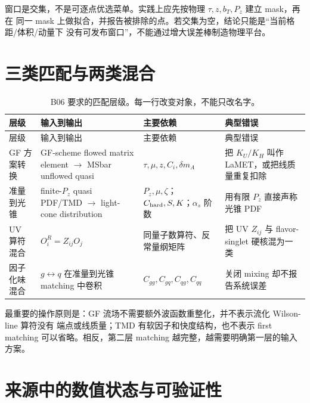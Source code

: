 窗口是交集，不是可逐点优选菜单。实践上应先按物理 \(\tau,z,b_T,P_z\) 建立 mask，再在
同一 mask 上做拟合，并报告被排除的点。若交集为空，结论只能是“当前格距/体积/动量下
没有可发布窗口”，不能通过增大误差棒制造物理平台。

\section{三类匹配与两类混合}

\begin{longtable}{@{}p{}p{}p{}p{}@{}}
\caption{B06 要求的匹配层级。每一行改变对象，不能只改名字。}\label{tab:b06-matching-layers}\\
\toprule
层级 & 输入到输出 & 主要依赖 & 典型错误 \\
\midrule
\endfirsthead
\toprule
层级 & 输入到输出 & 主要依赖 & 典型错误 \\
\midrule
\endhead
GF 方案转换 & GF-scheme flowed matrix element \(\to\) MSbar unflowed quasi & \(\tau,\mu,z,C_i,\delta m_A\) & 把 \(K_U/K_H\) 叫作 LaMET，或把线质量重复扣除 \\
准量到光锥 & finite-\(P_z\) quasi PDF/TMD \(\to\) light-cone distribution & \(P_z,\mu,\zeta\)；\(C_{\rm hard},S,K\)；\(\alpha_s\) 阶数 & 用有限 \(P_z\) 直接声称光锥 PDF \\
UV 算符混合 & \(O_i^{R}=Z_{ij}O_j\) & 同量子数算符、反常量纲矩阵 & 把 UV \(Z_{ij}\) 与 flavor-singlet 硬核混为一类 \\
因子化味混合 & \(g\leftrightarrow q\) 在准量到光锥 matching 中卷积 & \(C_{gg},C_{gq},C_{qg},C_{qq}\) & 关闭 mixing 却不报告系统误差 \\
\bottomrule
\end{longtable}

最重要的操作原则是：GF 流场不需要额外波函数重整化，并不表示流化 Wilson-line 算符没有
端点或线质量；TMD 有软因子和快度结构，也不表示 first matching 可以省略。相反，第二层
matching 越完整，越需要明确第一层的输入方案。

\section{来源中的数值状态与可验证性}


